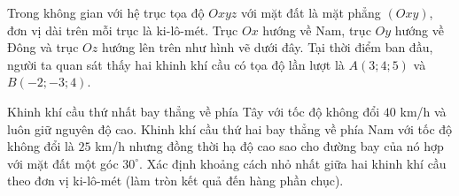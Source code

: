 \begin{ex}
Trong không gian với hệ trục tọa độ $Oxyz$ với mặt đất là mặt phẳng $(Oxy)$, đơn vị dài trên mỗi trục là ki-lô-mét. Trục $Ox$ hướng về Nam, trục $Oy$ hướng về Đông và trục $Oz$ hướng lên trên như hình vẽ dưới đây. Tại thời điểm ban đầu, người ta quan sát thấy hai khinh khí cầu có tọa độ lần lượt là $A(3;4;5)$ và $B(-2;-3;4)$.
\begin{center}
\end{center}
Khinh khí cầu thứ nhất bay thẳng về phía Tây với tốc độ không đổi $40$ km/h và luôn giữ nguyên độ cao. Khinh khí cầu thứ hai bay thẳng về phía Nam với tốc độ không đổi là $25$ km/h nhưng đồng thời hạ độ cao sao cho đường bay của nó hợp với mặt đất một góc $30^\circ$. Xác định khoảng cách nhỏ nhất giữa hai khinh khí cầu theo đơn vị ki-lô-mét (làm tròn kết quả đến hàng phần chục).
\end{ex}
